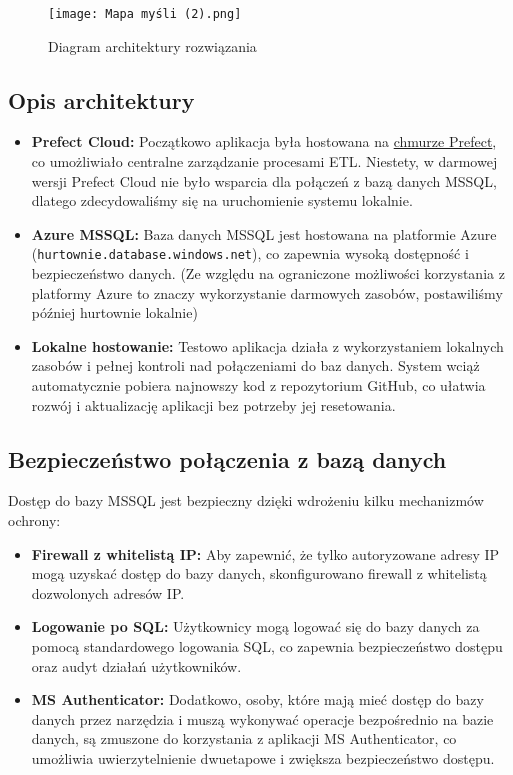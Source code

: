 \documentclass[12pt]{article}
\begin{document}
\begin{figure}[h!]
    \centering
    \texttt{[image: Mapa myśli (2).png]}
    \caption{Diagram architektury rozwiązania}
\end{figure}

\subsection{Opis architektury}

\begin{itemize}
    \item \textbf{Prefect Cloud:} Początkowo aplikacja była hostowana na
    \href{https://app.prefect.cloud}{chmurze Prefect}, co umożliwiało centralne zarządzanie procesami ETL. Niestety, w darmowej wersji Prefect Cloud nie było wsparcia dla połączeń z bazą danych MSSQL, dlatego zdecydowaliśmy się na uruchomienie systemu lokalnie.
    \item \textbf{Azure MSSQL:} Baza danych MSSQL jest hostowana na platformie Azure
    \\(\texttt{hurtownie.database.windows.net}), co zapewnia wysoką dostępność i bezpieczeństwo danych. (Ze względu na ograniczone możliwości korzystania z platformy Azure to znaczy wykorzystanie darmowych zasobów, postawiliśmy później hurtownie lokalnie)
    \item \textbf{Lokalne hostowanie:} Testowo aplikacja działa z wykorzystaniem lokalnych zasobów i pełnej kontroli nad połączeniami do baz danych. System wciąż automatycznie pobiera najnowszy kod z repozytorium GitHub, co ułatwia rozwój i aktualizację aplikacji bez potrzeby jej resetowania.

\end{itemize}

\subsection{Bezpieczeństwo połączenia z bazą danych}

Dostęp do bazy MSSQL jest bezpieczny dzięki wdrożeniu kilku mechanizmów ochrony:
\begin{itemize}
    \item \textbf{Firewall z whitelistą IP:} Aby zapewnić, że tylko autoryzowane adresy IP mogą uzyskać dostęp do bazy danych, skonfigurowano firewall z whitelistą dozwolonych adresów IP.
    \item \textbf{Logowanie po SQL:} Użytkownicy mogą logować się do bazy danych za pomocą standardowego logowania SQL, co zapewnia bezpieczeństwo dostępu oraz audyt działań użytkowników.
    \item \textbf{MS Authenticator:} Dodatkowo, osoby, które mają mieć dostęp do bazy danych przez narzędzia i muszą wykonywać operacje bezpośrednio na bazie danych, są zmuszone do korzystania z aplikacji MS Authenticator, co umożliwia uwierzytelnienie dwuetapowe i zwiększa bezpieczeństwo dostępu.
\end{itemize}
\end{document}
